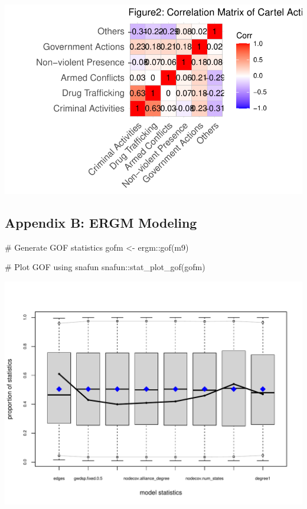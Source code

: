 \documentclass[
]{article}
\newenvironment{Shaded}{\begin{snugshade}}{\end{snugshade}}
\newcommand{\CommentTok}[1]{\textcolor[rgb]{0.37,0.37,0.37}{#1}}
\newcommand{\FunctionTok}[1]{\textcolor[rgb]{0.28,0.35,0.67}{#1}}
\newcommand{\NormalTok}[1]{\textcolor[rgb]{0.00,0.23,0.31}{#1}}
\newcommand{\OtherTok}[1]{\textcolor[rgb]{0.00,0.23,0.31}{#1}}
\newcommand{\SpecialCharTok}[1]{\textcolor[rgb]{0.37,0.37,0.37}{#1}}
\begin{document}
\includegraphics{Team4GroupProject_files/figure-pdf/unnamed-chunk-23-1.pdf}

\subsection{Appendix B: ERGM Modeling}\label{appendix-b-ergm-modeling}

\begin{Shaded}
\begin{Highlighting}[]
\CommentTok{\# Generate GOF statistics}
\NormalTok{gofm }\OtherTok{\textless{}{-}}\NormalTok{ ergm}\SpecialCharTok{::}\FunctionTok{gof}\NormalTok{(m9)}

\CommentTok{\# Plot GOF using snafun}
\NormalTok{snafun}\SpecialCharTok{::}\FunctionTok{stat\_plot\_gof}\NormalTok{(gofm)}
\end{Highlighting}
\end{Shaded}

\includegraphics{Team4GroupProject_files/figure-pdf/unnamed-chunk-24-1.pdf}
\end{document}
